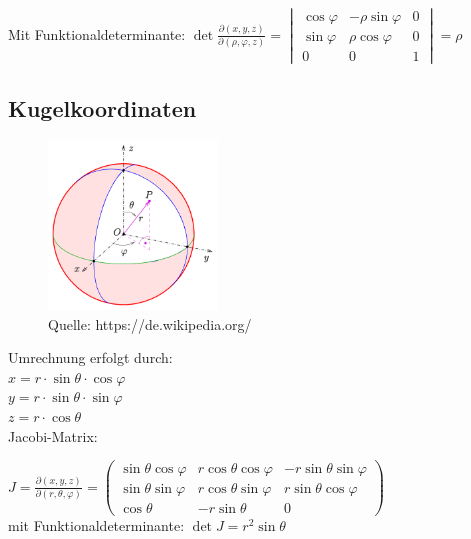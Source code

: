 Mit Funktionaldeterminante:
$
\det\frac{\partial(x,y,z)}{\partial(\rho,\varphi,z)}=\begin{vmatrix}
  \cos\varphi & -\rho\sin\varphi & 0 \\
  \sin\varphi &  \rho\cos\varphi & 0 \\
            0 &                0 & 1
\end{vmatrix}=\rho$


\subsection{Kugelkoordinaten}
\begin{figure}[h!]
\centering
    \includegraphics[width=0.4\textwidth]{images/kugelkoord.png}
    \caption{Quelle: https://de.wikipedia.org/}
    
\end{figure}

Umrechnung erfolgt durch: \\
$x = r \cdot \sin \theta \cdot \cos \varphi$ \\
$y = r \cdot \sin \theta \cdot \sin \varphi$ \\
$z = r \cdot \cos \theta$ \\

Jacobi-Matrix:

$J =\frac{\partial(x,y,z)}{\partial(r,\theta,\varphi)}
  =\begin{pmatrix}
     \sin\theta\cos\varphi&r\cos\theta\cos\varphi&-r\sin\theta\sin\varphi\\
     \sin\theta \sin\varphi&r\cos\theta\sin\varphi&r\sin\theta\cos\varphi\\
     \cos\theta&-r\sin\theta&0
   \end{pmatrix}$\\
   
   mit Funktionaldeterminante:
   $\det J=r^2\sin\theta$









